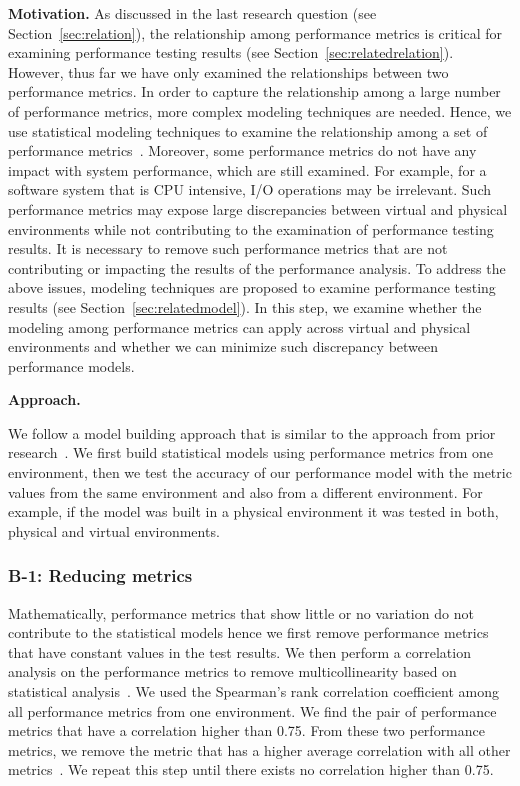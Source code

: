 \documentclass[smallextended]{svjour3}       %
\begin{document}
\noindent \textbf{Motivation.}
As discussed in the last research question (see Section~\ref{sec:relation}), the relationship among performance metrics is critical for examining performance testing results (see Section~\ref{sec:relatedrelation}). However, thus far we have only examined the relationships between two performance metrics. In order to capture the relationship among a large number of performance metrics, more complex modeling techniques are needed. Hence, we use statistical modeling techniques to examine the relationship among a set of performance metrics~\cite{xiong2013vperfguard,cohen2004correlating}. Moreover, some performance metrics do not have any impact with system performance, which are still examined. For example, for a software system that is CPU intensive, I/O operations may be irrelevant. Such performance metrics may expose large discrepancies between virtual and physical environments while not contributing to the examination of performance testing results. It is necessary to remove such performance metrics that are not contributing or impacting the results of the performance analysis. To address the above issues, modeling techniques are proposed to examine performance testing results (see Section~\ref{sec:relatedmodel}). In this step, we examine whether the modeling among performance metrics can apply across virtual and physical environments and whether we can minimize such discrepancy between performance models.


\noindent \textbf{Approach. }

We follow a model building approach that is similar to the approach from prior research~\cite{Shang:2015:ADP:2668930.2688052,Cohen:2005:CIC:1095810.1095821,xiong2013vperfguard}. We first build statistical models using performance metrics from one environment, then we test the accuracy of our performance model with the metric values from the same environment and also from a different environment. For example, if the model was built in a physical environment it was tested in both, physical and virtual environments.

\subsubsection{B-1: Reducing metrics}

Mathematically, performance metrics that show little or no variation do not contribute to the statistical models hence we first remove performance metrics that have constant values in the test results. We then perform a correlation analysis on the performance metrics to remove multicollinearity based on statistical analysis~\cite{cor_R}. We used the Spearman's rank correlation coefficient among all performance metrics from one environment. We find the pair of performance metrics that have a correlation higher than 0.75. From these two performance metrics, we remove the metric that has a higher average correlation with all other metrics~\cite{Syer2016}. We repeat this step until there exists no correlation higher than 0.75.
\end{document}
